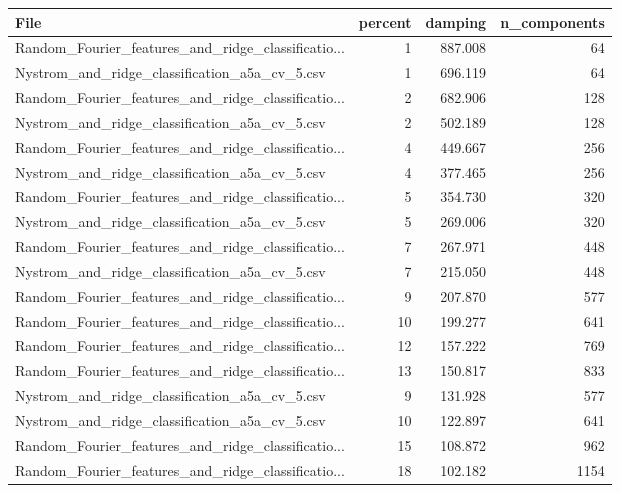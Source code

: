 \begin{tabularx}{\textwidth}{lrrr}
\toprule
                                              File &  percent &  damping &  n\_components \\
\midrule
Random\_Fourier\_features\_and\_ridge\_classificatio... &        1 &  887.008 &            64 \\
     Nystrom\_and\_ridge\_classification\_a5a\_cv\_5.csv &        1 &  696.119 &            64 \\
Random\_Fourier\_features\_and\_ridge\_classificatio... &        2 &  682.906 &           128 \\
     Nystrom\_and\_ridge\_classification\_a5a\_cv\_5.csv &        2 &  502.189 &           128 \\
Random\_Fourier\_features\_and\_ridge\_classificatio... &        4 &  449.667 &           256 \\
     Nystrom\_and\_ridge\_classification\_a5a\_cv\_5.csv &        4 &  377.465 &           256 \\
Random\_Fourier\_features\_and\_ridge\_classificatio... &        5 &  354.730 &           320 \\
     Nystrom\_and\_ridge\_classification\_a5a\_cv\_5.csv &        5 &  269.006 &           320 \\
Random\_Fourier\_features\_and\_ridge\_classificatio... &        7 &  267.971 &           448 \\
     Nystrom\_and\_ridge\_classification\_a5a\_cv\_5.csv &        7 &  215.050 &           448 \\
Random\_Fourier\_features\_and\_ridge\_classificatio... &        9 &  207.870 &           577 \\
Random\_Fourier\_features\_and\_ridge\_classificatio... &       10 &  199.277 &           641 \\
Random\_Fourier\_features\_and\_ridge\_classificatio... &       12 &  157.222 &           769 \\
Random\_Fourier\_features\_and\_ridge\_classificatio... &       13 &  150.817 &           833 \\
     Nystrom\_and\_ridge\_classification\_a5a\_cv\_5.csv &        9 &  131.928 &           577 \\
     Nystrom\_and\_ridge\_classification\_a5a\_cv\_5.csv &       10 &  122.897 &           641 \\
Random\_Fourier\_features\_and\_ridge\_classificatio... &       15 &  108.872 &           962 \\
Random\_Fourier\_features\_and\_ridge\_classificatio... &       18 &  102.182 &          1154 \\

\end{tabularx}
